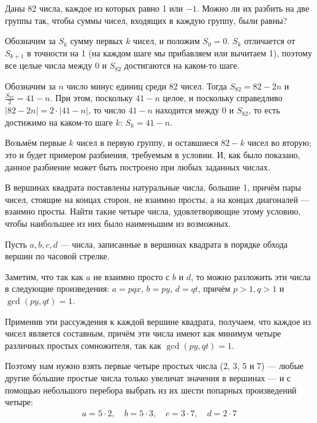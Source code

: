 

\begin{itemize}
\itA Даны 82 числа, каждое из которых равно 1 или $-1$. Можно ли их разбить на две группы так, 
чтобы суммы чисел, входящих в каждую группу, были равны?

\itr Обозначим за $S_k$ сумму первых $k$ чисел, и положим $S_0 = 0$. 
$S_k$ отличается от $S_{k+1}$ в точности на 1 (на каждом шаге мы прибавляем или 
вычитаем 1), поэтому все целые числа между $0$ и $S_{82}$ достигаются на каком-то шаге.

Обозначим за $n$ число минус единиц среди 82 чисел. Тогда $S_{82} = 82-2n$
и $\frac{S_{82}}{2} = 41-n$. При этом, поскольку $41-n$ целое, и поскольку справедливо 
$|82-2n|=2\cdot|41-n|$, то число $41-n$ находится между 0 и $S_{82}$, то есть 
достижимо на каком-то шаге $k$: $S_k = 41-n$.

Возьмём первые $k$ чисел в первую группу, и оставшиеся $82-k$ чисел во вторую; это и будет
примером разбиения, требуемым в условии. И, как было показано, данное разбиение может быть 
построено при любых заданных числах.
\end{itemize}


\begin{itemize}
\itC В вершинах квадрата поставлены натуральные числа, большие 1, причём пары чисел, 
стоящие на концах сторон, не взаимно просты, а на концах диагоналей --- взаимно просты. 
Найти такие четыре числа, удовлетворяющие этому условию,
чтобы наибольшее из них было наименьшим из возможных.

\itr 
Пусть $a,b,c,d$ --- числа, записанные в вершинах квадрата в порядке обхода вершин по часовой стрелке. 

\begin{center}
\end{center}

Заметим, что так как $a$ не взаимно просто с $b$ и $d$, то можно разложить эти числа в 
следующие произведения:
$a = pqx$, $b = py$, $d = qt$, причём $p>1, q>1$ и $\gcd(py,qt)=1$. 

Применив эти рассуждения к каждой вершине квадрата, получаем, что каждое из чисел является
составным, причём эти числа имеют как минимум четыре различных простых сомножителя, 
так как $\gcd(py,qt)=1$. 

Поэтому нам нужно взять первые четыре простых числа (2, 3, 5 и 7) --- любые другие б\'ольшие простые числа
только увеличат значения в вершинах --- и с помощью небольшого перебора
выбрать из их шести попарных произведений четыре:
$$
\begin{array}{l}
a=5 \cdot 2,\quad
b=5 \cdot 3,\quad
c=3 \cdot 7,\quad
d=2 \cdot 7
\end{array}
$$
\end{itemize}

